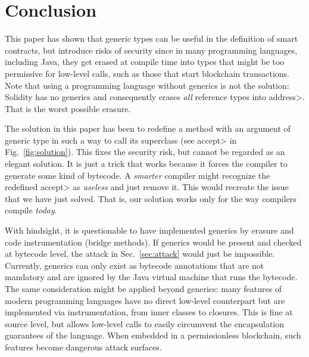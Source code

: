 \section{Conclusion}\label{sec:conclusion} 

This paper has shown that generic types can be useful in the definition
of smart contracts, but introduce risks of security since in many
programming languages, including Java, they get erased at compile time
into types that might be too permissive for low-level calls, such as
those that start blockchain transactions. Note that using a programming
language without generics is not the solution: Solidity has no generics
and consequently erases \emph{all} reference types into \<address>.
That is the worst possible erasure.

The solution in this paper has been to redefine a method with an argument
of generic type in such a way to call its superclass
(see \<accept> in Fig.~\ref{fig:solution}). This fixes the security risk,
but cannot be regarded as an elegant solution. It is just a trick that
works because it forces the compiler to generate some kind of bytecode.
A \emph{smarter} compiler might recognize the redefined \<accept> as
\emph{useless} and just remove it. This would recreate the issue that
we have just solved. That is, our solution works only for the way
compilers compile \emph{today}.

With hindsight, it is questionable to have implemented generics by erasure
and code instrumentation (bridge methods). If generics would be present
and checked at bytecode level, the attack in Sec.~\ref{sec:attack} would just
be impossible. Currently, generics can only exist as bytecode annotations
that are not mandatory and are ignored by the Java virtual machine
that runs the bytecode. The same consideration might be applied beyond
generics: many features of modern programming
languages have no direct low-level
counterpart but are implemented via instrumentation, from
inner classes to closures. This is fine at source level, but allows
low-level calls to easily circumvent
the encapsulation guarantees of the language. When embedded in a permissionless
blockchain, such features become dangerous attack surfaces.
